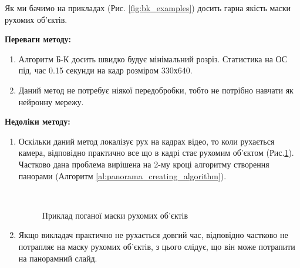 Як ми бачимо на прикладах (Рис. \ref{fig:bk_examples}) досить гарна якість маски рухомих об'єктів.

\textbf{Переваги методу:}
\begin{enumerate}
    \item Алгоритм Б-К досить швидко будує мінімальний розріз. Статистика на ОС
          під, час 0.15 секунди на кадр розміром 330х640.
    \item Даний метод не потребує ніякої передобробки, тобто не потрібно навчати
          як нейронну мережу.
\end{enumerate}

\textbf{Недоліки методу:}
\begin{enumerate}
    \item Оскільки даний метод локалізує рух на кадрах відео, то коли
          рухається камера, відповідно практично все що в кадрі стає рухомим об'єктом
          (Рис.\ref{fig:bk_bad_mask}).
          Частково дана проблема вирішена на 2-му кроці алгоритму створення панорами
          (Алгоритм \ref{al:panorama_creating_algorithm}).
          \begin{figure}[H]
              \centering

               \\
              \caption{Приклад поганої маски рухомих об'єктів \cite{dorohovtsev_video}
                  \label{fig:bk_bad_mask}
              }
          \end{figure}

    \item Якщо викладач практично не рухається довгий час, відповідно частково не потрапляє
          на маску рухомих об'єктів, з цього слідує, що він може потрапити на панорамний слайд.
\end{enumerate}


